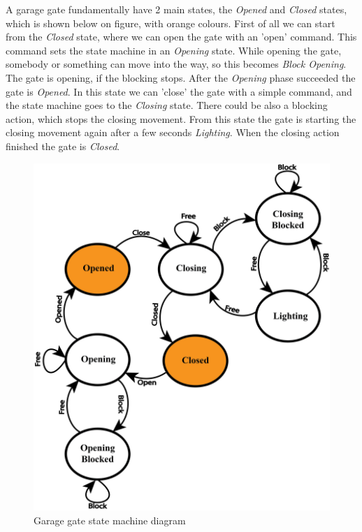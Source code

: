 A garage gate fundamentally have 2 main states, the \textit{Opened} and \textit{Closed} states, which is shown below on  figure, with orange colours.  First of all we can start from the \textit{Closed} state, where we can open the gate with an 'open' command. This command sets the state machine in an \textit{Opening} state. While opening the gate, somebody or something can move into the way, so this becomes \textit{Block Opening}. The gate is opening, if the blocking stops. After the \textit{Opening} phase succeeded the gate is \textit{Opened}. In this state we can 'close' the gate with a simple command, and the state machine goes to the \textit{Closing} state. There could be also a blocking action, which stops the closing movement. From this state the gate is starting the closing movement again after a few seconds \textit{Lighting}. When the closing action finished the gate is \textit{Closed}.



\begin{figure}[!ht]
\centering
\includegraphics[width=150mm, keepaspectratio]{figures/garageState.png}
\caption{Garage gate state machine diagram}
\label{fig:Garage Statemachine}
\end{figure}

